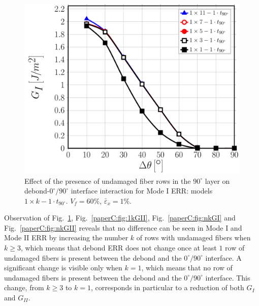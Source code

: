 \begin{figure}[!htb]
\centering
\includegraphics[width=\textwidth]{paperC/1xk-1-vf60-GI.pdf}
\caption{Effect of the presence of undamaged fiber rows in the $90^{\circ}$ layer on debond-$0^{\circ}/90^{\circ}$ interface interaction for Mode I ERR: models $1\times k-1\cdot t_{90^{\circ}}$. $V_{f}=60\%$, $\bar{\varepsilon}_{x}=1\%$.}\label{paperC:fig:1kGI}
\end{figure}

Observation of Fig.~\ref{paperC:fig:1kGI}, Fig.~\ref{paperC:fig:1kGII}, Fig.~\ref{paperC:fig:nkGI} and Fig.~\ref{paperC:fig:nkGII} reveals that no difference can be seen in Mode I and Mode II ERR by increasing the number $k$ of rows with undamaged fibers when $k\geq3$, which means that debond ERR does not change once at least $1$ row of undamaged fibers is present between the debond and the $0^{\circ}/90^{\circ}$ interface. A significant change is visible only when $k=1$, which means that no row of undamaged fibers is present between the debond and the $0^{\circ}/90^{\circ}$ interface. This change, from $k\geq3$ to $k=1$, corresponds in particular to a reduction of both $G_{I}$ and $G_{II}$.

